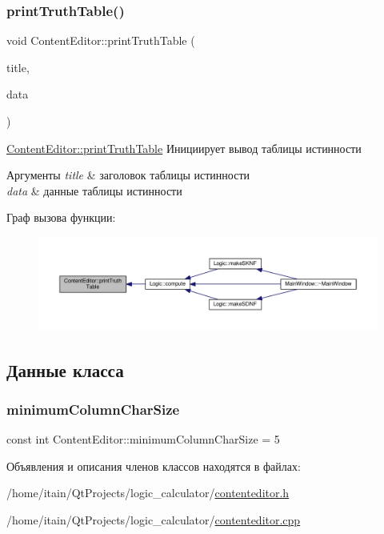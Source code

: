 \subsubsection{\texorpdfstring{print\+Truth\+Table()}{printTruthTable()}}
{\footnotesize\ttfamily void Content\+Editor\+::print\+Truth\+Table (\begin{DoxyParamCaption}\item[{const Q\+List$<$ Q\+String $>$ \&}]{title,  }\item[{const Q\+List$<$ Q\+List$<$ bool $>$$>$ \&}]{data }\end{DoxyParamCaption})}



\hyperlink{class_content_editor_a4244e9ccd627ab8146d74637837872e9}{Content\+Editor\+::print\+Truth\+Table} Инициирует вывод таблицы истинности 


\begin{DoxyParams}{Аргументы}
{\em title} & заголовок таблицы истинности \\
\hline
{\em data} & данные таблицы истинности \\
\hline
\end{DoxyParams}
Граф вызова функции\+:\nopagebreak
\begin{figure}[H]
\begin{center}
\leavevmode
\includegraphics[width=350pt]{class_content_editor_a4244e9ccd627ab8146d74637837872e9_icgraph}
\end{center}
\end{figure}


\subsection{Данные класса}
\mbox{\label{class_content_editor_a20a8d18e264777aee600ee638f08eb99}} 
\subsubsection{\texorpdfstring{minimum\+Column\+Char\+Size}{minimumColumnCharSize}}
{\footnotesize\ttfamily const int Content\+Editor\+::minimum\+Column\+Char\+Size = 5}



Объявления и описания членов классов находятся в файлах\+:\begin{DoxyCompactItemize}
\item 
/home/itain/\+Qt\+Projects/logic\+\_\+calculator/\hyperlink{contenteditor_8h}{contenteditor.\+h}\item 
/home/itain/\+Qt\+Projects/logic\+\_\+calculator/\hyperlink{contenteditor_8cpp}{contenteditor.\+cpp}\end{DoxyCompactItemize}
